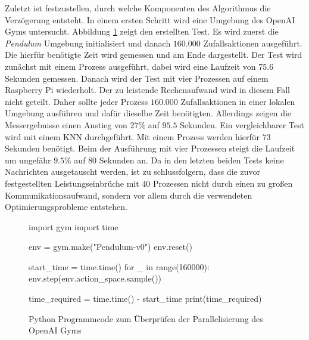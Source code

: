 Zuletzt ist festzustellen, durch welche Komponenten des Algorithmus die Verzögerung entsteht. In einem ersten Schritt wird eine Umgebung des OpenAI Gyms untersucht. Abbildung \ref{fig:test_bottleneck} zeigt den erstellten Test. Es wird zuerst die \emph{Pendulum} Umgebung initialisiert und danach $160.000$ Zufallsaktionen ausgeführt. Die hierfür benötigte Zeit wird gemessen und am Ende dargestellt. Der Test wird zunächst mit einem Prozess ausgeführt, dabei wird eine Laufzeit von $75.6$ Sekunden gemessen. Danach wird der Test mit vier Prozessen auf einem Raspberry Pi wiederholt. Der zu leistende Rechenaufwand wird in diesem Fall nicht geteilt. Daher sollte jeder Prozess $160.000$ Zufallsaktionen in einer lokalen Umgebung ausführen und dafür dieselbe Zeit benötigten. Allerdings zeigen die Messergebnisse einen Anstieg von $27\%$ auf $95.5$ Sekunden. Ein vergleichbarer Test wird mit einem \ac{KNN} durchgeführt. Mit einem Prozess werden hierfür $73$ Sekunden benötigt. Beim der Ausführung mit vier Prozessen steigt die Laufzeit um ungefähr $9.5\%$ auf 80 Sekunden an. Da in den letzten beiden Tests keine Nachrichten ausgetauscht werden, ist zu schlussfolgern, dass die zuvor festgestellten Leistungseinbrüche mit $40$ Prozessen nicht durch einen zu großen Kommunikationsaufwand, sondern vor allem durch die verwendeten Optimierungsprobleme entstehen. 
\begin{figure}
	\begin{python}
		import gym
		import time
		
		env = gym.make("Pendulum-v0")
		env.reset()
		
		start_time = time.time()
		for _ in range(160000):
			env.step(env.action_space.sample())
		
		time_required = time.time() - start_time
		print(time_required)
	\end{python}
	\label{fig:test_bottleneck}
	\caption{Python Programmcode zum Überprüfen der Parallelisierung des OpenAI Gyms}
\end{figure} 


